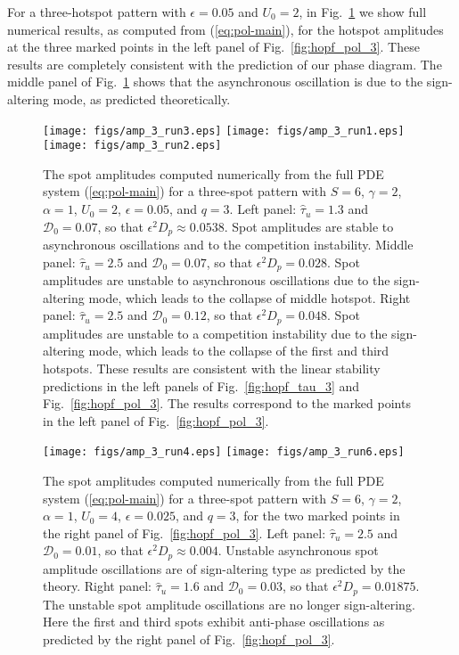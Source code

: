 \documentclass{article}%
\begin{document}
For a three-hotspot pattern with $\epsilon=0.05$ and $U_0=2$, in
Fig.~\ref{fig:valid_3spot_q3} we show full numerical results, as
computed from (\ref{eq:pol-main}), for the hotspot amplitudes at the
three marked points in the left panel of
Fig.~\ref{fig:hopf_pol_3}. These results are completely consistent
with the prediction of our phase diagram. The middle panel of
Fig.~\ref{fig:valid_3spot_q3} shows that the asynchronous oscillation
is due to the sign-altering mode, as predicted theoretically.

\begin{figure}[htbp]
\centering
\texttt{[image: figs/amp\_3\_run3.eps]}
\texttt{[image: figs/amp\_3\_run1.eps]}
\texttt{[image: figs/amp\_3\_run2.eps]}
\caption{\label{fig:valid_3spot_q3} The spot amplitudes
  computed numerically from the full PDE system (\ref{eq:pol-main})
  for a three-spot pattern with $S=6$, $\gamma=2$, $\alpha=1$,
  $U_0=2$, $\epsilon=0.05$, and $q=3$.  Left panel: $\hat{\tau}_u=1.3$
  and ${\mathcal D}_0=0.07$, so that $\epsilon^2 D_p\approx
  0.0538$. Spot amplitudes are stable to asynchronous oscillations and
  to the competition instability.  Middle panel: $\hat{\tau}_u=2.5$
  and ${\mathcal D}_0=0.07$, so that $\epsilon^2 D_p=0.028$.  Spot
  amplitudes are unstable to asynchronous oscillations due to the
  sign-altering mode, which leads to the collapse of middle
  hotspot. Right panel: $\hat{\tau}_u=2.5$ and ${\mathcal D}_0=0.12$,
  so that $\epsilon^2 D_p=0.048$. Spot amplitudes are unstable to a
  competition instability due to the sign-altering mode, which leads
  to the collapse of the first and third hotspots. These results are
  consistent with the linear stability predictions in the left panels
  of Fig.~\ref{fig:hopf_tau_3} and Fig.~\ref{fig:hopf_pol_3}.  The
  results correspond to the marked points in the left panel of
  Fig.~\ref{fig:hopf_pol_3}. }
\end{figure}

\begin{figure}[htbp]
\centering
\texttt{[image: figs/amp\_3\_run4.eps]}
\texttt{[image: figs/amp\_3\_run6.eps]}
\caption{\label{fig:valid_3spot_q3_b} The spot amplitudes
  computed numerically from the full PDE system (\ref{eq:pol-main})
  for a three-spot pattern with $S=6$, $\gamma=2$, $\alpha=1$,
  $U_0=4$, $\epsilon=0.025$, and $q=3$, for the two marked points in the
  right panel of Fig.~\ref{fig:hopf_pol_3}. Left panel:
  $\hat{\tau}_u=2.5$ and ${\mathcal D}_0=0.01$, so that $\epsilon^2
  D_p\approx 0.004$. Unstable asynchronous spot amplitude oscillations
  are of sign-altering type as predicted by the theory. Right panel:
  $\hat{\tau}_u=1.6$ and ${\mathcal D}_0=0.03$, so that $\epsilon^2
  D_p=0.01875$.  The unstable spot amplitude oscillations are no
  longer sign-altering. Here the first and third spots exhibit
  anti-phase oscillations as predicted by the right panel of
  Fig.~\ref{fig:hopf_pol_3}.}
\end{figure}
\end{document}
